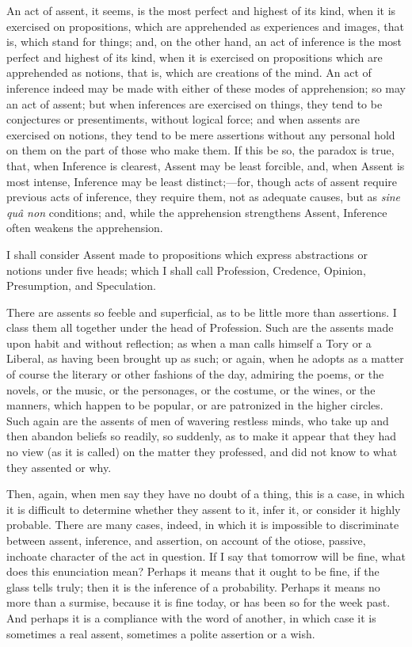 An act of assent, it seems, is the most perfect and highest of its
kind, when it is exercised on propositions, which are apprehended as
experiences and images, that is, which stand for things; and, on the
other hand, an act of inference is the most perfect and highest of its
kind, when it is exercised on propositions which are apprehended as
notions, that is, which are creations of the mind. An act of inference
indeed may be made with either of these modes of apprehension; so may
an act of assent; but when inferences are exercised on things, they
tend to be conjectures or presentiments, without logical force; and
when assents are exercised on notions, they tend to be mere assertions
without any personal hold on them on the part of those who make them.
If this be so, the paradox is true, that, when Inference is
clearest, Assent may be least forcible, and, when Assent is most
intense, Inference may be least distinct;—for, though acts of assent
require previous acts of inference, they require them, not as adequate
causes, but as \emph{sine quâ non} conditions; and, while the
apprehension strengthens Assent, Inference often weakens the
apprehension.


I shall consider Assent made to propositions which express
abstractions or notions under five heads; which I shall call
Profession, Credence, Opinion, Presumption, and Speculation.


There are assents so feeble and superficial, as to be little more
than assertions. I class them all together under the head of
Profession. Such are the assents made upon habit and without
reflection; as when a man calls himself a Tory or a Liberal, as having
been brought up as such; or again, when he adopts as a matter of
course the literary or other fashions of the day, admiring the poems,
or the novels, or the music, or the personages, or the costume, or the
wines, or the manners, which happen to be popular, or are patronized
in the higher circles. Such again are the assents of men of wavering
restless minds, who take up and then abandon beliefs so readily, so
suddenly, as to make it appear that they had no view (as it is called)
on the matter they professed, and did not know to what they assented
or why.

Then, again, when men say they have no doubt of a thing, this is a
case, in which it is difficult to determine whether they assent to it,
infer it, or consider it highly probable. There are many cases,
indeed, in which it is impossible to discriminate between assent,
inference, and assertion, on account of the otiose, passive, inchoate
character of the act in question. If I say that tomorrow will be fine,
what does this enunciation mean? Perhaps it means that it ought to be
fine, if the glass tells truly; then it is the inference of a
probability. Perhaps it means no more than a surmise, because it is
fine today, or has been so for the week past. And perhaps it is a
compliance with the word of another, in which case it is sometimes a
real assent, sometimes a polite assertion or a wish.

